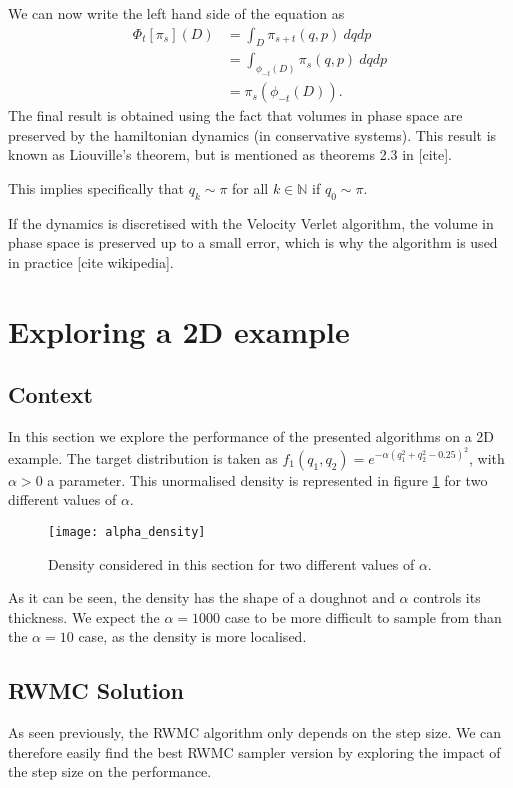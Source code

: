 \documentclass[a4paper, 12pt,oneside]{article}
\begin{document}
			We can now write the left hand side of the equation as
			\begin{align}
				\Phi_t[\pi_s](D)&=\int_D \pi_{s+t}(q,p)\ dqdp \\
					&=\int_{\phi_{-t}(D)}\pi_{s}(q,p)\ dqdp \\
					&=\pi_s(\phi_{-t}(D)).
			\end{align}
			The final result is obtained using the fact that volumes in phase space are preserved by the hamiltonian dynamics (in conservative systems). This result is known as Liouville's theorem, but is mentioned as theorems 2.3 in [cite].
	
			This implies specifically that $q_k\sim\pi$ for all $k\in\mathbb{N}$ if $q_0\sim \pi$. 
	
			If the dynamics is discretised with the Velocity Verlet algorithm, the volume in phase space is preserved up to a small error, which is why the algorithm is used in practice [cite wikipedia].
	\section{Exploring a 2D example}
		\subsection{Context}
		In this section we explore the performance of the presented algorithms on a 2D example. The target distribution is taken as $f_1(q_1,q_2)=e^{-\alpha(q_1^2+q_2^2-0.25)^2}$, with $\alpha>0$ a parameter. This unormalised density is represented in figure \ref{fig:alpha-density} for two different values of $\alpha$.
        \begin{figure}[htb]
            \centering
                \vspace{0em}
                \texttt{[image: alpha\_density]}
                \caption{Density considered in this section for two different values of $\alpha$.}
                \label{fig:alpha-density}
        \end{figure}
		As it can be seen, the density has the shape of a doughnot and $\alpha$ controls its thickness. We expect the $\alpha=1000$ case to be more difficult to sample from than the $\alpha=10$ case, as the density is more localised.
		\subsection{RWMC Solution}
			As seen previously, the RWMC algorithm only depends on the step size. We can therefore easily find the best RWMC sampler version by exploring the impact of the step size on the performance. 
			
\end{document}
